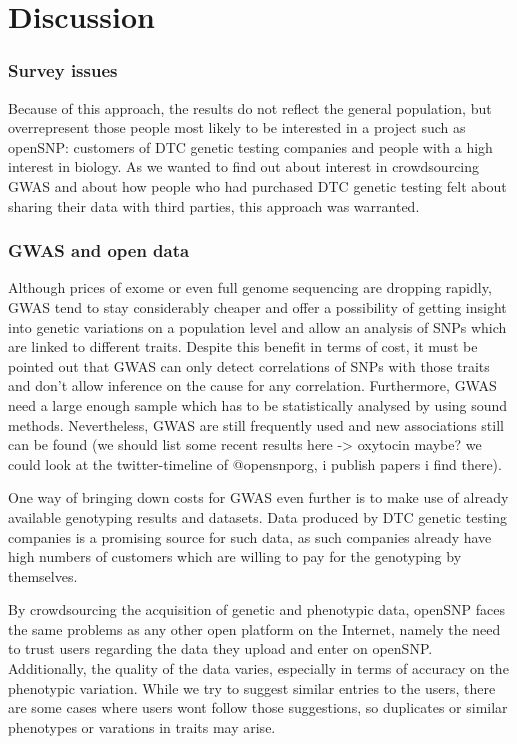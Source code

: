 \documentclass[10pt]{article}
\begin{document}
\section*{Discussion}

\subsubsection*{Survey issues}
Because of this approach, the results do not reflect the general population, but overrepresent those people most likely to be interested in a project such as openSNP: customers of DTC genetic testing companies and people with a high interest in biology. As we wanted to find out about interest in crowdsourcing GWAS and about how people who had purchased DTC genetic testing felt about sharing their data with third parties, this approach was warranted.
\subsubsection*{GWAS and open data}
Although prices of exome or even full genome sequencing are dropping rapidly, GWAS tend to stay considerably cheaper and offer a possibility of getting insight into genetic variations on a population level and allow an analysis of SNPs which are linked to different traits. Despite this benefit in terms of cost, it must be pointed out that GWAS can only detect correlations of SNPs with those traits and don't allow inference on the cause for any correlation. Furthermore, GWAS need a large enough sample which has to be statistically analysed by using sound methods. Nevertheless, GWAS are still frequently used and new associations still can be found (we should list some recent results here -> oxytocin maybe? we could look at the twitter-timeline of @opensnporg, i publish papers i find there).

One way of bringing down costs for GWAS even further is to make use of already available genotyping results and datasets. Data produced by DTC genetic testing companies is a promising source for such data, as such companies already have high numbers of customers which are willing to pay for the genotyping by themselves.

By crowdsourcing the acquisition of genetic and phenotypic data, openSNP faces the same problems as any other open platform on the Internet, namely the need to trust users regarding the data they upload and enter on openSNP. Additionally, the quality of the data varies, especially in terms of accuracy on the phenotypic variation. While we try to suggest similar entries to the users, there are some cases where users wont follow those suggestions, so duplicates or similar phenotypes or varations in traits may arise. 
\end{document}
